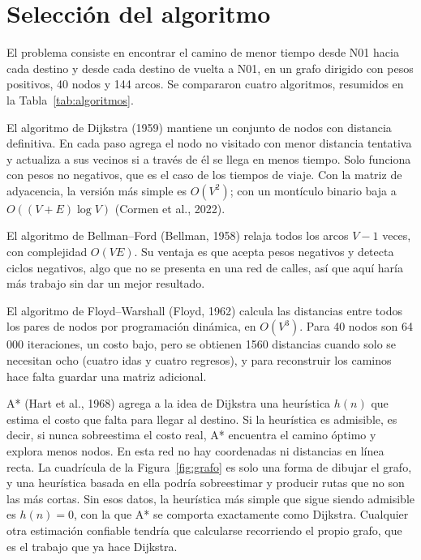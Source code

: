 \documentclass[11pt,letterpaper]{article}
\begin{document}
\section{Selección del algoritmo}

El problema consiste en encontrar el camino de menor tiempo desde N01 hacia cada destino y desde cada destino de vuelta a N01, en un grafo dirigido con pesos positivos, 40 nodos y 144 arcos. Se compararon cuatro algoritmos, resumidos en la Tabla~\ref{tab:algoritmos}.

El algoritmo de Dijkstra (1959) mantiene un conjunto de nodos con distancia definitiva. En cada paso agrega el nodo no visitado con menor distancia tentativa y actualiza a sus vecinos si a través de él se llega en menos tiempo. Solo funciona con pesos no negativos, que es el caso de los tiempos de viaje. Con la matriz de adyacencia, la versión más simple es $O(V^2)$; con un montículo binario baja a $O((V+E)\log V)$ (Cormen et al., 2022).

El algoritmo de Bellman--Ford (Bellman, 1958) relaja todos los arcos $V-1$ veces, con complejidad $O(VE)$. Su ventaja es que acepta pesos negativos y detecta ciclos negativos, algo que no se presenta en una red de calles, así que aquí haría más trabajo sin dar un mejor resultado.

El algoritmo de Floyd--Warshall (Floyd, 1962) calcula las distancias entre todos los pares de nodos por programación dinámica, en $O(V^3)$. Para 40 nodos son 64\,000 iteraciones, un costo bajo, pero se obtienen 1560 distancias cuando solo se necesitan ocho (cuatro idas y cuatro regresos), y para reconstruir los caminos hace falta guardar una matriz adicional.

A* (Hart et al., 1968) agrega a la idea de Dijkstra una heurística $h(n)$ que estima el costo que falta para llegar al destino. Si la heurística es admisible, es decir, si nunca sobreestima el costo real, A* encuentra el camino óptimo y explora menos nodos. En esta red no hay coordenadas ni distancias en línea recta. La cuadrícula de la Figura~\ref{fig:grafo} es solo una forma de dibujar el grafo, y una heurística basada en ella podría sobreestimar y producir rutas que no son las más cortas. Sin esos datos, la heurística más simple que sigue siendo admisible es $h(n)=0$, con la que A* se comporta exactamente como Dijkstra. Cualquier otra estimación confiable tendría que calcularse recorriendo el propio grafo, que es el trabajo que ya hace Dijkstra.
\end{document}
